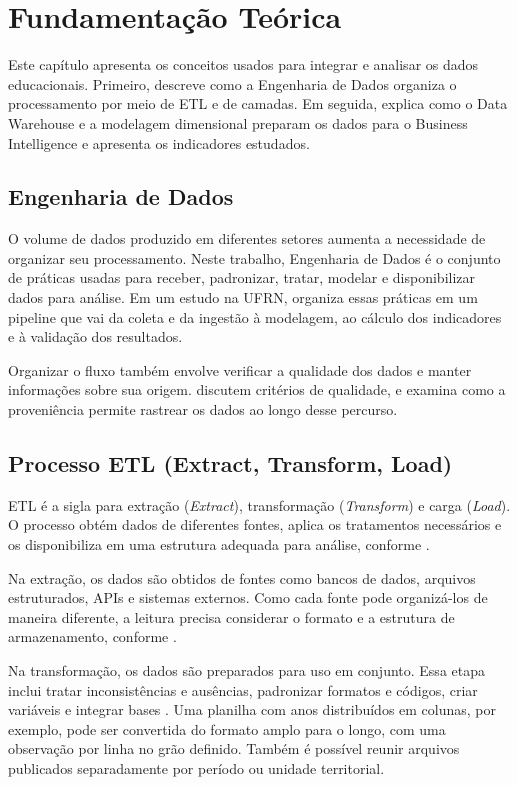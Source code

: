 \chapter[Fundamentação Teórica]{Fundamentação Teórica}

Este capítulo apresenta os conceitos usados para integrar e analisar os dados educacionais. Primeiro, descreve como a Engenharia de Dados organiza o processamento por meio de ETL e de camadas. Em seguida, explica como o Data Warehouse e a modelagem dimensional preparam os dados para o Business Intelligence e apresenta os indicadores estudados.

\section{Engenharia de Dados}

O volume de dados produzido em diferentes setores aumenta a necessidade de organizar seu processamento. Neste trabalho, Engenharia de Dados é o conjunto de práticas usadas para receber, padronizar, tratar, modelar e disponibilizar dados para análise. Em um estudo na UFRN,  organiza essas práticas em um pipeline que vai da coleta e da ingestão à modelagem, ao cálculo dos indicadores e à validação dos resultados.

Organizar o fluxo também envolve verificar a qualidade dos dados e manter informações sobre sua origem.  discutem critérios de qualidade, e  examina como a proveniência permite rastrear os dados ao longo desse percurso.

\section{Processo ETL (Extract, Transform, Load)}

ETL é a sigla para extração (\textit{Extract}), transformação (\textit{Transform}) e carga (\textit{Load}). O processo obtém dados de diferentes fontes, aplica os tratamentos necessários e os disponibiliza em uma estrutura adequada para análise, conforme .

Na extração, os dados são obtidos de fontes como bancos de dados, arquivos estruturados, APIs e sistemas externos. Como cada fonte pode organizá-los de maneira diferente, a leitura precisa considerar o formato e a estrutura de armazenamento, conforme .

Na transformação, os dados são preparados para uso em conjunto. Essa etapa inclui tratar inconsistências e ausências, padronizar formatos e códigos, criar variáveis e integrar bases \cite{kimball2013data}. Uma planilha com anos distribuídos em colunas, por exemplo, pode ser convertida do formato amplo para o longo, com uma observação por linha no grão definido. Também é possível reunir arquivos publicados separadamente por período ou unidade territorial.


